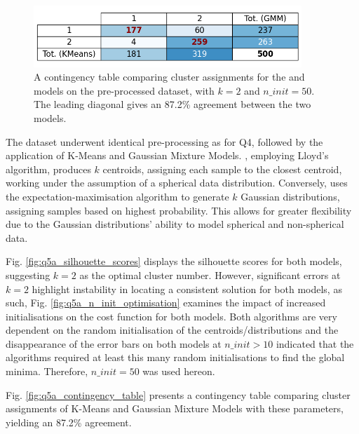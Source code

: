     \begin{figure}[htb]
    \centering
    \includegraphics[width=0.9\textwidth]{./figures/q5a_contingency_table}
    \caption{A contingency table comparing cluster assignments for the  and 
        models on the pre-processed  dataset, with $k=2$ and $n\_init=50$. The leading diagonal
        gives an 87.2\% agreement between the two models.}
    \label{fig:q5a_contingency_table}
    \end{figure}

    The dataset  underwent identical pre-processing as for Q4, followed by
    the application of K-Means and Gaussian Mixture Models.
    , employing Lloyd's algorithm, produces $k$ centroids, assigning each sample to the closest centroid,
    working under the assumption of a spherical data distribution.
    Conversely,  uses the expectation-maximisation algorithm to generate $k$ Gaussian
    distributions, assigning samples based on highest probability.
    This allows for greater flexibility due to the Gaussian distributions' ability to model spherical and non-spherical
    data.

    Fig. \eqref{fig:q5a_silhouette_scores} displays the silhouette scores for both models, suggesting $k=2$ as the optimal
    cluster number.
    However, significant errors at $k=2$ highlight instability in locating a consistent solution for both models,
    as such, Fig. \eqref{fig:q5a_n_init_optimisation} examines the impact of increased initialisations on the cost function for both models.
    Both algorithms are very dependent on the random initialisation of the centroids/distributions and the disappearance
    of the error bars on both models at $n\_init > 10$ indicated that the algorithms required at least this many random
    initialisations to find the global minima.
    Therefore, $n\_init=50$ was used hereon.

    Fig. \eqref{fig:q5a_contingency_table} presents a contingency table comparing cluster assignments of K-Means and
    Gaussian Mixture Models with these parameters, yielding an 87.2\% agreement.

